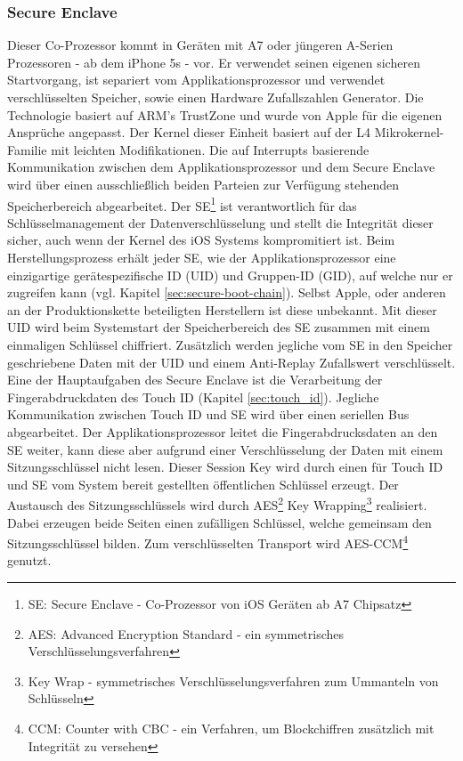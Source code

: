 	\subsubsection{Secure Enclave}\label{sec:secure_enclave}
		Dieser Co-Prozessor kommt in Geräten mit A7 oder jüngeren A-Serien
		Prozessoren - ab dem iPhone 5s - vor. Er verwendet seinen eigenen
		sicheren Startvorgang, ist separiert vom Applikationsprozessor und verwendet
		verschlüsselten Speicher, sowie einen Hardware Zufallszahlen Generator. Die
		Technologie basiert auf ARM's TrustZone \cite{TrustZone2015} und wurde von
		Apple für die eigenen Ansprüche angepasst. Der Kernel dieser Einheit basiert
		auf der L4 Mikrokernel-Familie \cite{L4MicroKernel2015} mit leichten
		Modifikationen. Die auf Interrupts basierende Kommunikation zwischen dem
		Applikationsprozessor und dem Secure Enclave wird über einen
		ausschließlich beiden Parteien zur Verfügung stehenden Speicherbereich
		abgearbeitet. Der SE\footnote{SE: Secure Enclave - Co-Prozessor von iOS
		Geräten ab A7 Chipsatz} ist verantwortlich für das Schlüsselmanagement der
		Datenverschlüsselung und stellt die Integrität dieser sicher, auch wenn der
		Kernel des iOS Systems kompromitiert ist. Beim Herstellungsprozess erhält
		jeder SE, wie der Applikationsprozessor eine einzigartige gerätespezifische
		ID (UID) und Gruppen-ID (GID), auf welche nur er zugreifen kann (vgl. Kapitel
		\ref{sec:secure-boot-chain}).
		Selbst Apple, oder anderen an der Produktionskette beteiligten Herstellern
		ist diese unbekannt. Mit dieser UID wird beim
		Systemstart der Speicherbereich des SE zusammen mit einem einmaligen
		Schlüssel chiffriert.
		Zusätzlich werden jegliche vom SE in den Speicher geschriebene Daten mit der
		UID und einem Anti-Replay Zufallswert verschlüsselt. Eine der Hauptaufgaben
		des Secure Enclave ist die Verarbeitung der Fingerabdruckdaten des Touch ID
		(Kapitel \ref{sec:touch_id}).
		Jegliche Kommunikation zwischen Touch ID und SE wird über einen seriellen Bus
		abgearbeitet. Der Applikationsprozessor leitet die Fingerabdrucksdaten an den
		SE weiter, kann diese aber aufgrund einer Verschlüsselung der Daten mit einem
		Sitzungsschlüssel nicht lesen. Dieser Session Key wird durch einen
		für Touch ID und SE vom System bereit gestellten öffentlichen
		Schlüssel erzeugt. Der Austausch des Sitzungsschlüssels wird durch
		AES\footnote{AES: Advanced Encryption Standard - ein symmetrisches
		Verschlüsselungsverfahren} Key Wrapping\footnote{Key Wrap - symmetrisches
		Verschlüsselungsverfahren zum Ummanteln von Schlüsseln} realisiert. Dabei
		erzeugen beide Seiten einen zufälligen Schlüssel, welche gemeinsam den
		Sitzungsschlüssel bilden. Zum verschlüsselten Transport wird
		AES-CCM\footnote{CCM: Counter with CBC - ein Verfahren, um Blockchiffren
		zusätzlich mit Integrität zu versehen} genutzt.
		
